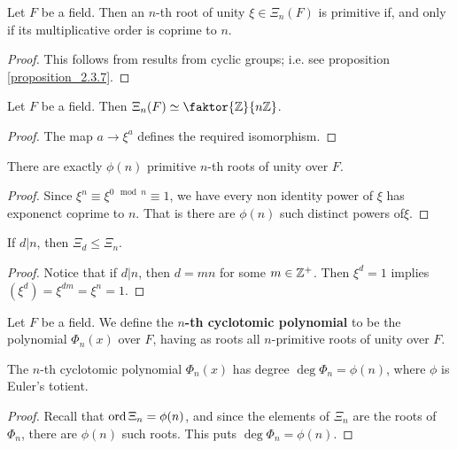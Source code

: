 \begin{proposition}\label{proposition_8.7.3}
  Let $F$ be a field. Then an $n$-th root of unity $\xi \in \Xi_n(F)$
  is primitive if, and only if its multiplicative order is coprime to
  $n$.
\end{proposition}
\begin{proof}
  This follows from results from cyclic groups; i.e. see proposition
  \ref{proposition_2.3.7}.
\end{proof}

\begin{proposition}\label{proposition_8.7.4}
  Let $F$ be a field. Then $\Xi_n(F) \simeq \faktor{\Z}{n\Z}$.
\end{proposition}
\begin{proof}
  The map $a \xrightarrow{} \xi^a$ defines the required isomorphism.
\end{proof}
\begin{corollary}
  There are exactly $\phi(n)$ primitive $n$-th roots of unity over
  $F$.
\end{corollary}
\begin{proof}
  Since $\xi^n \equiv \xi^{0 \mod{n}} \equiv 1$, we have every non identity
  power of $\xi$ has exponenct coprime to  $n$. That is there are $\phi(n)$
  such distinct powers of$\xi$.
\end{proof}
\begin{corollary}
  If $d|n$, then  $\Xi_d \leq \Xi_n$.
\end{corollary}
\begin{proof}
  Notice that if $d|n$, then $d=mn$ for some  $m \in \mathbb{Z}^+$. Then $\xi^d=1$
  implies  $(\xi^d)=\xi^{dm}=\xi^n=1$.
\end{proof}

\begin{definition}
  Let $F$ be a field. We define the \textbf{$n$-th cyclotomic
  polynomial} to be the polynomial $\Phi_n(x)$ over $F$,
  having as roots all $n$-primitive roots of unity over $F$.
\end{definition}

\begin{proposition}\label{proposition_8.7.5}
  The $n$-th cyclotomic polynomial  $\Phi_n(x)$ has degree
  $\deg{\Phi_n}=\phi(n)$, where $\phi$ is Euler's totient.
\end{proposition}
\begin{proof}
  Recall that $\operatorname{ord}{\Xi_n}=\phi(n)$, and since the elements of $\Xi_n$ are the
  roots of  $\Phi_n$, there are  $\phi(n)$ such roots. This puts
  $\deg{\Phi_n}=\phi(n)$.
\end{proof}

